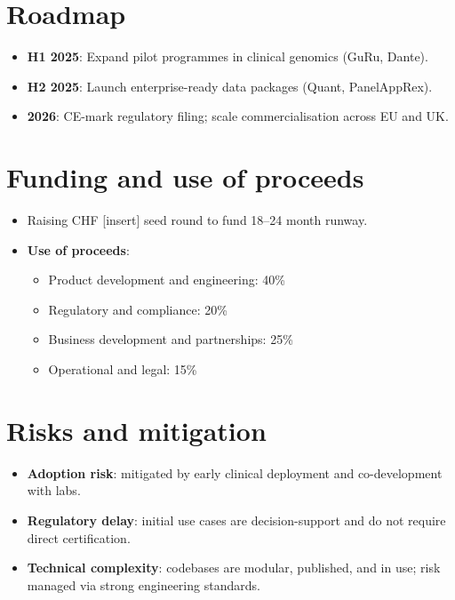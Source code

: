 \section*{Roadmap}
\begin{itemize}[leftmargin=*]
  \item \textbf{H1 2025}: Expand pilot programmes in clinical genomics (GuRu, Dante).
  \item \textbf{H2 2025}: Launch enterprise-ready data packages (Quant, PanelAppRex).
  \item \textbf{2026}: CE-mark regulatory filing; scale commercialisation across EU and UK.
\end{itemize}

\section*{Funding and use of proceeds}
\begin{itemize}[leftmargin=*]
  \item Raising CHF [insert] seed round to fund 18–24 month runway.
  \item \textbf{Use of proceeds}:
    \begin{itemize}
      \item Product development and engineering: 40\%
      \item Regulatory and compliance: 20\%
      \item Business development and partnerships: 25\%
      \item Operational and legal: 15\%
    \end{itemize}
\end{itemize}

\section*{Risks and mitigation}
\begin{itemize}[leftmargin=*]
  \item \textbf{Adoption risk}: mitigated by early clinical deployment and co-development with labs.
  \item \textbf{Regulatory delay}: initial use cases are decision-support and do not require direct certification.
  \item \textbf{Technical complexity}: codebases are modular, published, and in use; risk managed via strong engineering standards.
\end{itemize}

